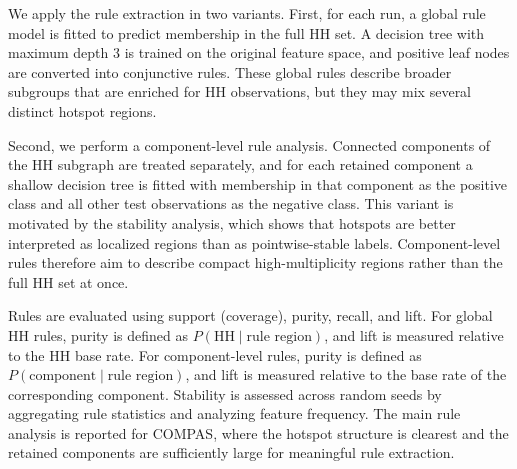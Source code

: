 We apply the rule extraction in two variants. First, for each run, a global rule model is
fitted to predict membership in the full HH set. A decision tree with maximum depth 3 is
trained on the original feature space, and positive leaf nodes are converted into
conjunctive rules. These global rules describe broader subgroups that are enriched for
HH observations, but they may mix several distinct hotspot regions.

Second, we perform a component-level rule analysis. Connected components of the HH
subgraph are treated separately, and for each retained component a shallow decision tree
is fitted with membership in that component as the positive class and all other test
observations as the negative class. This variant is motivated by the stability analysis,
which shows that hotspots are better interpreted as localized regions than as
pointwise-stable labels. Component-level rules therefore aim to describe compact
high-multiplicity regions rather than the full HH set at once.

Rules are evaluated using support (coverage), purity, recall, and lift. For global HH rules,
purity is defined as $P(\text{HH} \mid \text{rule region})$, and lift is measured relative to
the HH base rate. For component-level rules, purity is defined as
$P(\text{component} \mid \text{rule region})$, and lift is measured relative to the base
rate of the corresponding component. Stability is assessed across random seeds by
aggregating rule statistics and analyzing feature frequency. The main rule analysis is
reported for COMPAS, where the hotspot structure is clearest and the retained
components are sufficiently large for meaningful rule extraction.
